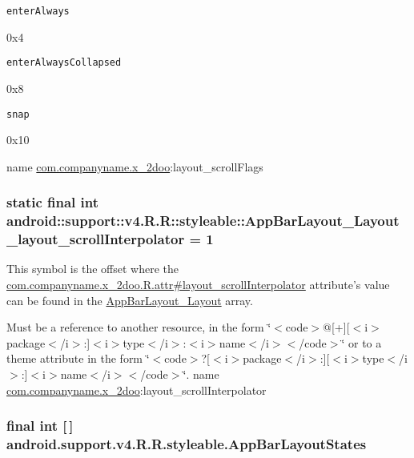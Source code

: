 {\tt enterAlways}

0x4

{\tt enterAlwaysCollapsed}

0x8

{\tt snap}

0x10

name \hyperlink{namespacecom_1_1companyname_1_1x__2doo}{com.companyname.x\_\-2doo}:layout\_\-scrollFlags \hypertarget{classandroid_1_1support_1_1v4_1_1_r_1_1styleable_ffbd29e3aa103fef348ea2fe39dfda75}{
\subsubsection[{AppBarLayout\_\-Layout\_\-layout\_\-scrollInterpolator}]{\setlength{\rightskip}{0pt plus 5cm}static final int android::support::v4.R.R::styleable::AppBarLayout\_\-Layout\_\-layout\_\-scrollInterpolator = 1}}
\label{classandroid_1_1support_1_1v4_1_1_r_1_1styleable_ffbd29e3aa103fef348ea2fe39dfda75}


This symbol is the offset where the \hyperlink{classcom_1_1companyname_1_1x__2doo_1_1_r_1_1attr_2a813ee94fe251ec08f7bbe0d4ea78c1}{com.companyname.x\_\-2doo.R.attr\#layout\_\-scrollInterpolator} attribute's value can be found in the \hyperlink{classandroid_1_1support_1_1v4_1_1_r_1_1styleable_3e73f9e75520cf590d9355042c5d4099}{AppBarLayout\_\-Layout} array.

Must be a reference to another resource, in the form \char`\"{}$<$code$>$@\mbox{[}+\mbox{]}\mbox{[}$<$i$>$package$<$/i$>$:\mbox{]}$<$i$>$type$<$/i$>$:$<$i$>$name$<$/i$>$$<$/code$>$\char`\"{} or to a theme attribute in the form \char`\"{}$<$code$>$?\mbox{[}$<$i$>$package$<$/i$>$:\mbox{]}\mbox{[}$<$i$>$type$<$/i$>$:\mbox{]}$<$i$>$name$<$/i$>$$<$/code$>$\char`\"{}.  name \hyperlink{namespacecom_1_1companyname_1_1x__2doo}{com.companyname.x\_\-2doo}:layout\_\-scrollInterpolator \hypertarget{classandroid_1_1support_1_1v4_1_1_r_1_1styleable_5c129aa478b2daed266bd62010493d47}{
\subsubsection[{AppBarLayoutStates}]{\setlength{\rightskip}{0pt plus 5cm}final int \mbox{[}$\,$\mbox{]} android.support.v4.R.R.styleable.AppBarLayoutStates}}
\label{classandroid_1_1support_1_1v4_1_1_r_1_1styleable_5c129aa478b2daed266bd62010493d47}


